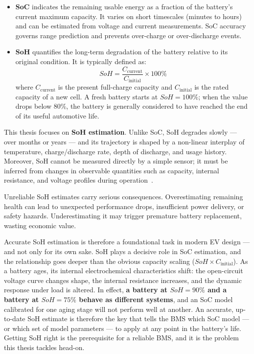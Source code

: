 \begin{itemize}
    \item \textbf{\gls{SoC}} indicates the remaining usable energy as a fraction of the battery's current maximum capacity. It varies on short timescales (minutes to hours) and can be estimated from voltage and current measurements. SoC accuracy governs range prediction and prevents over-charge or over-discharge events.

    \item \textbf{\gls{SoH}} quantifies the long-term degradation of the battery relative to its original condition. It is typically defined as:
    \begin{equation}
    \label{eq:soh}
    SoH = \frac{C_\text{current}}{C_\text{initial}} \times 100\%
    \end{equation}
    where $C_\text{current}$ is the present full-charge capacity and $C_\text{initial}$ is the rated capacity of a new cell. A fresh battery starts at $SoH = 100\%$; when the value drops below 80\%, the battery is generally considered to have reached the end of its useful automotive life.
\end{itemize}

This thesis focuses on \textbf{SoH estimation}. Unlike SoC, SoH degrades slowly — over months or years — and its trajectory is shaped by a non-linear interplay of temperature, charge/discharge rate, depth of discharge, and usage history. Moreover, SoH cannot be measured directly by a simple sensor; it must be inferred from changes in observable quantities such as capacity, internal resistance, and voltage profiles during operation~\autocite{ng2020}.

Unreliable SoH estimates carry serious consequences. Overestimating remaining health can lead to unexpected performance drops, insufficient power delivery, or safety hazards. Underestimating it may trigger premature battery replacement, wasting economic value.

Accurate SoH estimation is therefore a foundational task in modern EV design — and not only for its own sake. SoH plays a decisive role in SoC estimation, and the relationship goes deeper than the obvious capacity scaling ($SoH \times C_\text{initial}$). As a battery ages, its internal electrochemical characteristics shift: the open-circuit voltage curve changes shape, the internal resistance increases, and the dynamic response under load is altered. In effect, \textbf{a battery at $SoH = 90\%$ and a battery at $SoH = 75\%$ behave as different systems}, and an SoC model calibrated for one aging stage will not perform well at another. An accurate, up-to-date SoH estimate is therefore the key that tells the BMS which SoC model — or which set of model parameters — to apply at any point in the battery's life. Getting SoH right is the prerequisite for a reliable BMS, and it is the problem this thesis tackles head-on.


